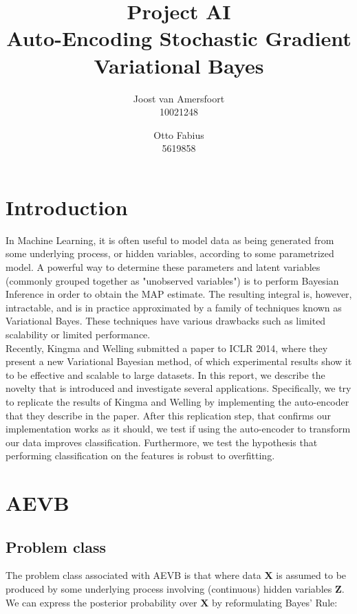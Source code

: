 \documentclass{article}
\begin{document}
\title{Project AI \\ Auto-Encoding Stochastic Gradient Variational Bayes}
\author{	
	Joost van Amersfoort \\ 10021248  
	\and
	Otto Fabius \\ 5619858
	}
\maketitle

\section{Introduction}

In Machine Learning, it is often useful to model data as being generated from some underlying process, or hidden variables, according to some parametrized model. A powerful way to determine these parameters and latent variables (commonly grouped together as "unobserved variables") is to perform Bayesian Inference in order to obtain the MAP estimate. The resulting integral is, however, intractable, and is in practice approximated by a family of techniques known as Variational Bayes. These techniques have various drawbacks such as limited scalability or limited performance. \\
Recently, Kingma and Welling \cite{kingma2013auto} submitted a paper to ICLR 2014, where they present a new Variational Bayesian method, of which experimental results show it to be effective and scalable to large datasets. In this report, we describe the novelty that is introduced and investigate several applications. Specifically, we try to replicate the results of Kingma and Welling by implementing the auto-encoder that they describe in the paper. After this replication step, that confirms our implementation works as it should, we test if using the auto-encoder to transform our data improves classification. Furthermore, we test the hypothesis that performing classification on the features is robust to overfitting. 

\section{AEVB}

\subsection*{Problem class}

The problem class associated with AEVB is that where data $\mathbf{X}$ is assumed to be produced by some underlying process involving (continuous) hidden variables $\mathbf{Z}$. We can express the posterior probability over $\mathbf{X}$ by reformulating Bayes' Rule:
\end{document}
